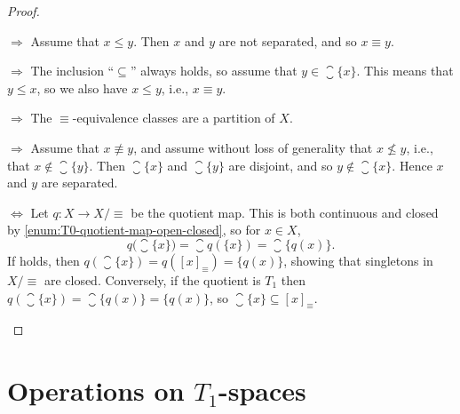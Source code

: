 \documentclass[article, a4paper, 11pt, oneside]{memoir}
\numberwithin{equation}{chapter}
\renewcommand{\implies}{\Rightarrow}
\renewcommand{\iff}{\Leftrightarrow}
\begin{document}
\begin{proof}
\begin{proofsec}
    \item[\subcref{enum:R0-space} $\implies$ \subcref{enum:R0-specialisation-preorder-symmetric}]
    Assume that $x \leq y$. Then $x$ and $y$ are not separated, and so $x \equiv y$.

    \item[\subcref{enum:R0-specialisation-preorder-symmetric} $\implies$ \subcref{enum:R0-closure-of-point}]
    The inclusion \enquote{$\subseteq$} always holds, so assume that $y \in \closure{\{x\}}$. This means that $y \leq x$, so we also have $x \leq y$, i.e., $x \equiv y$.
    
    \item[\subcref{enum:R0-closure-of-point} $\implies$ \subcref{enum:R0-partition}]
    The $\equiv$-equivalence classes are a partition of $X$.
    
    \item[\subcref{enum:R0-partition} $\implies$ \subcref{enum:R0-space}]
    Assume that $x \not\equiv y$, and assume without loss of generality that $x \not\leq y$, i.e., that $x \not\in \closure{\{y\}}$. Then $\closure{\{x\}}$ and $\closure{\{y\}}$ are disjoint, and so $y \not\in \closure{\{x\}}$. Hence $x$ and $y$ are separated.

    \item[\subcref{enum:R0-closure-of-point} $\iff$ \subcref{enum:R0-quotient-is-T1}]
    Let $q \colon X \to X/{\equiv}$ be the quotient map. This is both continuous and closed by \cref{enum:T0-quotient-map-open-closed}, so for $x \in X$,
    \begin{equation*}
        q\bigl( \closure{\{x\}} \bigr)
            = \closure{q(\{x\})}
            = \closure{\{q(x)\}}.
    \end{equation*}
    If  holds, then $q(\closure{\{x\}}) = q([x]_\equiv) = \{q(x)\}$, showing that singletons in $X/{\equiv}$ are closed. Conversely, if the quotient is $T_1$ then $q(\closure{\{x\}}) = \closure{\{q(x)\}} = \{q(x)\}$, so $\closure{\{x\}} \subseteq [x]_\equiv$.
\end{proofsec}
\end{proof}



\section[Operations on T1-spaces][Operations on $T_1$-spaces]{Operations on $T_1$-spaces}
\end{document}
